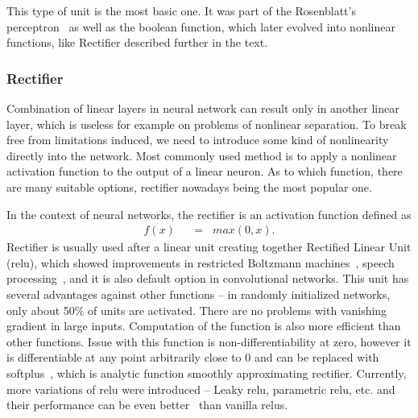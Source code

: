 This type of unit is the most basic one. It was part of the Rosenblatt's perceptron~\cite{rosenblatt58a} as well as the boolean function, which later evolved into nonlinear functions, like Rectifier described further in the text.

\subsubsection{Rectifier}

Combination of linear layers in neural network can result only in another linear layer, which is useless for example on problems of nonlinear separation. To break free from limitations induced, we need to introduce some kind of nonlinearity directly into the network. Most commonly used method is to apply a nonlinear activation function to the output of a linear neuron. As to which function, there are many suitable options, rectifier nowadays being the most popular one.

In the context of neural networks, the rectifier is an activation function defined as
\begin{align}
f(x) \hspace{7pt}&=\hspace{7pt} max(0,x). \label{eq:rectifier}
\end{align}
Rectifier is usually used after a linear unit creating together Rectified Linear Unit (\gls{relu}), which showed improvements in restricted Boltzmann machines~\cite{DBLP:conf/icml/NairH10}, speech processing~\cite{zeiler2013rectified}, and it is also default option in convolutional networks. This unit has several advantages against other functions -- in randomly initialized networks, only about 50\% of units are activated. There are no problems with vanishing gradient in large inputs. Computation of the function is also more efficient than other functions. Issue with this function is non-differentiability at zero, however it is differentiable at any point arbitrarily close to 0 and can be replaced with softplus~\cite{dugas2001incorporating}, which is analytic function smoothly approximating rectifier. Currently, more variations of \gls{relu} were introduced -- Leaky \gls{relu}, parametric \gls{relu}, etc. and their performance can be even better~\cite{DBLP:journals/corr/XuWCL15} than vanilla \gls{relu}s.

